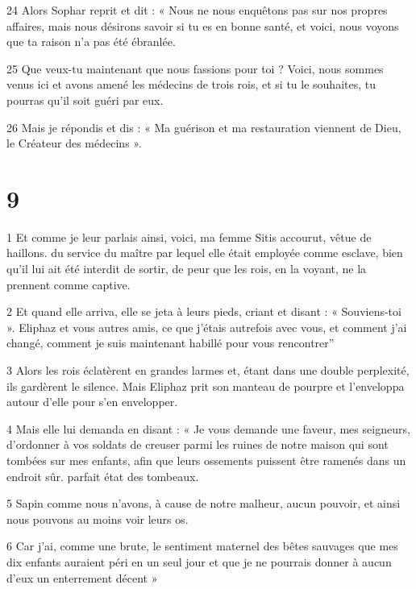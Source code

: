 \par 24 Alors Sophar reprit et dit : « Nous ne nous enquêtons pas sur nos propres affaires, mais nous désirons savoir si tu es en bonne santé, et voici, nous voyons que ta raison n'a pas été ébranlée.

\par 25 Que veux-tu maintenant que nous fassions pour toi ? Voici, nous sommes venus ici et avons amené les médecins de trois rois, et si tu le souhaites, tu pourras qu'il soit guéri par eux.

\par 26 Mais je répondis et dis : « Ma guérison et ma restauration viennent de Dieu, le Créateur des médecins ».

\chapter{9}

\par 1 Et comme je leur parlais ainsi, voici, ma femme Sitis accourut, vêtue de haillons. du service du maître par lequel elle était employée comme esclave, bien qu'il lui ait été interdit de sortir, de peur que les rois, en la voyant, ne la prennent comme captive.

\par 2 Et quand elle arriva, elle se jeta à leurs pieds, criant et disant : « Souviens-toi ». Eliphaz et vous autres amis, ce que j'étais autrefois avec vous, et comment j'ai changé, comment je suis maintenant habillé pour vous rencontrer''

\par 3 Alors les rois éclatèrent en grandes larmes et, étant dans une double perplexité, ils gardèrent le silence. Mais Eliphaz prit son manteau de pourpre et l'enveloppa autour d'elle pour s'en envelopper.

\par 4 Mais elle lui demanda en disant : « Je vous demande une faveur, mes seigneurs, d'ordonner à vos soldats de creuser parmi les ruines de notre maison qui sont tombées sur mes enfants, afin que leurs ossements puissent être ramenés dans un endroit sûr. parfait état des tombeaux.

\par 5 Sapin comme nous n'avons, à cause de notre malheur, aucun pouvoir, et ainsi nous pouvons au moins voir leurs os.

\par 6 Car j'ai, comme une brute, le sentiment maternel des bêtes sauvages que mes dix enfants auraient péri en un seul jour et que je ne pourrais donner à aucun d'eux un enterrement décent »

